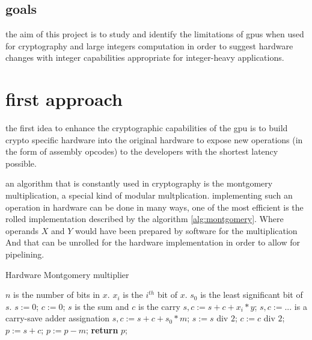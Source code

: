 \documentclass{report}
\begin{document}
\section{goals}
    the aim of this project is to study and identify the limitations of gpus
    when used for cryptography and large integers computation in order to suggest
    hardware changes with integer capabilities appropriate for integer-heavy applications.

\chapter{first approach}
    the first idea to enhance the cryptographic capabilities of the gpu is to
    build crypto specific hardware into the original hardware to expose new 
    operations (in the form of assembly opcodes) to the developers with the 
    shortest latency possible. 
    
    an algorithm that is constantly used in cryptography is the montgomery multiplication,
    a special kind of modular multplication. implementing such an operation in hardware can
    be done in many ways, one of the most efficient is the rolled implementation described
    by the algorithm \ref{alg:montgomery}. Where operands $X$ and $Y$ would have been prepared
    by software for the multiplication And that can be unrolled for the hardware implementation
    in order to allow for pipelining.
    
    \begin{algorithm}
    \caption{Hardware Montgomery multiplier\cite{montgomeryHard}}\label{alg:montgomery}
    \begin{algorithmic}[1]
        \statex $n$ is the number of bits in $x$.
        \statex $x_i$ is the $i^{th}$ bit of $x$.
        \statex $s_0$ is the least significant bit of $s$. 		
        \state $s := 0$; $c := 0$; \comment $s$ is the sum and $c$ is the carry
            \state $s,c := s + c + x_i * y$; \comment $s,c := ...$ is a carry-save adder assignation
            \state $s,c := s + c + s_0 * m$;
            \state $s := s$ div $2$; $c := c$ div $2$;  
        \endfor
        \state $p := s + c$;
            \state $p := p - m$;
        \endif
        \state \textbf{return} $p$;
    \end{algorithmic}
    \end{algorithm}
    
\end{document}
